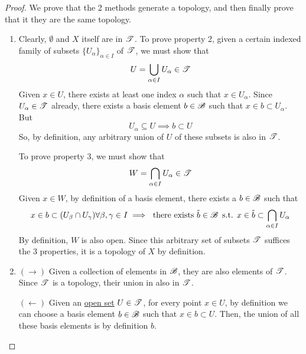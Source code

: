   \begin{proof}
    We prove that the 2 methods generate a topology, and then finally prove that it they are the same topology. 
    \begin{enumerate}
      \item Clearly, $\emptyset$ and $X$ itself are in $\operatorname{\mathscr{T}}$. To prove property 2, given a certain indexed family of subsets $\{U_\alpha\}_{\alpha \in I}$ of $\operatorname{\mathscr{T}}$, we must show that 
      \begin{equation}
        U = \bigcup_{\alpha \in I} U_\alpha \in \operatorname{\mathscr{T}}
      \end{equation}
      Given $x \in U$, there exists at least one index $\alpha$ such that $x \in U_\alpha$. Since $U_\alpha \in \operatorname{\mathscr{T}}$ already, there exists a basis element $b \in \operatorname{\mathscr{B}}$ such that $x \in b \subset U_\alpha$. But 
      \begin{equation}
        U_\alpha \subseteq U \implies b \subset U
      \end{equation}
      So, by definition, any arbitrary union of $U$ of these subsets is also in $\operatorname{\mathscr{T}}$. 

      To prove property 3, we must show that 
      \begin{equation}
        W = \bigcap_{\alpha \in I} U_\alpha \in \operatorname{\mathscr{T}}
      \end{equation}
      Given $x \in W$, by definition of a basis element, there exists a $b \in \operatorname{\mathscr{B}}$ such that 
      \begin{equation}
        x \in b \subset (U_\beta \cap U_\gamma) \forall \beta, \gamma \in I \implies \text{ there exists } \Tilde{b} \in \operatorname{\mathscr{B}} \text{ s.t. } x \in \Tilde{b} \subset \bigcap_{\alpha \in I} U_\alpha
      \end{equation}
      By definition, $W$ is also open. Since this arbitrary set of subsets $\operatorname{\mathscr{T}}$ suffices the 3 properties, it is a topology of $X$ by definition. 

      \item $(\rightarrow)$ Given a collection of elements in $\operatorname{\mathscr{B}}$, they are also elements of $\operatorname{\mathscr{T}}$. Since $\operatorname{\mathscr{T}}$ is a topology, their union in also in $\operatorname{\mathscr{T}}$. 

      $(\leftarrow)$ Given an \hyperref[def:open-set]{open set} $U \in \operatorname{\mathscr{T}}$, for every point $x \in U$, by definition we can choose a basis element $b \in \operatorname{\mathscr{B}}$ such that $x \in b \subset U$. Then, the union of all these basis elements is by definition $b$. 
        
    \end{enumerate}
  \end{proof}

